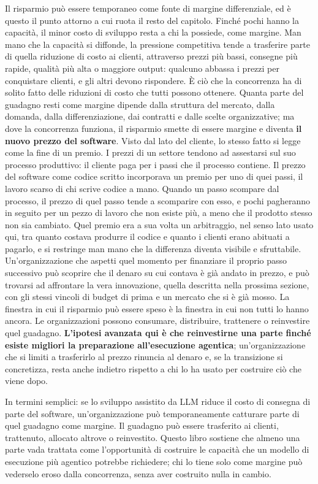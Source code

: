 \documentclass[10pt,oneside,openany]{book}
\newcommand{\keyidea}[1]{%
  \vspace{3pt}
  \noindent\fbox{\begin{minipage}{0.94\linewidth}\small\raggedright\textbf{Idea chiave.} #1\end{minipage}}
  \vspace{3pt}
}
\renewcommand{\keyidea}[1]{\begin{keyideabox}#1\end{keyideabox}}
\begin{document}
Il risparmio può essere temporaneo come fonte di margine differenziale, ed è questo il punto attorno a cui ruota il resto del capitolo. Finché pochi hanno la capacità, il minor costo di sviluppo resta a chi la possiede, come margine. Man mano che la capacità si diffonde, la pressione competitiva tende a trasferire parte di quella riduzione di costo ai clienti, attraverso prezzi più bassi, consegne più rapide, qualità più alta o maggiore output: qualcuno abbassa i prezzi per conquistare clienti, e gli altri devono rispondere. È ciò che la concorrenza ha di solito fatto delle riduzioni di costo che tutti possono ottenere. Quanta parte del guadagno resti come margine dipende dalla struttura del mercato, dalla domanda, dalla differenziazione, dai contratti e dalle scelte organizzative; ma dove la concorrenza funziona, il risparmio smette di essere margine e diventa \textbf{il nuovo prezzo del software}. Visto dal lato del cliente, lo stesso fatto si legge come la fine di un premio. I prezzi di un settore tendono ad assestarsi sul suo processo produttivo: il cliente paga per i passi che il processo contiene. Il prezzo del software come codice scritto incorporava un premio per uno di quei passi, il lavoro scarso di chi scrive codice a mano. Quando un passo scompare dal processo, il prezzo di quel passo tende a scomparire con esso, e pochi pagheranno in seguito per un pezzo di lavoro che non esiste più, a meno che il prodotto stesso non sia cambiato. Quel premio era a sua volta un arbitraggio, nel senso lato usato qui, tra quanto costava produrre il codice e quanto i clienti erano abituati a pagarlo, e si restringe man mano che la differenza diventa visibile e sfruttabile. Un'organizzazione che aspetti quel momento per finanziare il proprio passo successivo può scoprire che il denaro su cui contava è già andato in prezzo, e può trovarsi ad affrontare la vera innovazione, quella descritta nella prossima sezione, con gli stessi vincoli di budget di prima e un mercato che si è già mosso. La finestra in cui il risparmio può essere speso è la finestra in cui non tutti lo hanno ancora. Le organizzazioni possono consumare, distribuire, trattenere o reinvestire quel guadagno. \textbf{L'ipotesi avanzata qui è che reinvestirne una parte finché esiste migliori la preparazione all'esecuzione agentica}; un'organizzazione che si limiti a trasferirlo al prezzo rinuncia al denaro e, se la transizione si concretizza, resta anche indietro rispetto a chi lo ha usato per costruire ciò che viene dopo.

\keyidea{In termini semplici: se lo sviluppo assistito da LLM riduce il costo di consegna di parte del software, un'organizzazione può temporaneamente catturare parte di quel guadagno come margine. Il guadagno può essere trasferito ai clienti, trattenuto, allocato altrove o reinvestito. Questo libro sostiene che almeno una parte vada trattata come l'opportunità di costruire le capacità che un modello di esecuzione più agentico potrebbe richiedere; chi lo tiene solo come margine può vederselo eroso dalla concorrenza, senza aver costruito nulla in cambio.}
\end{document}
